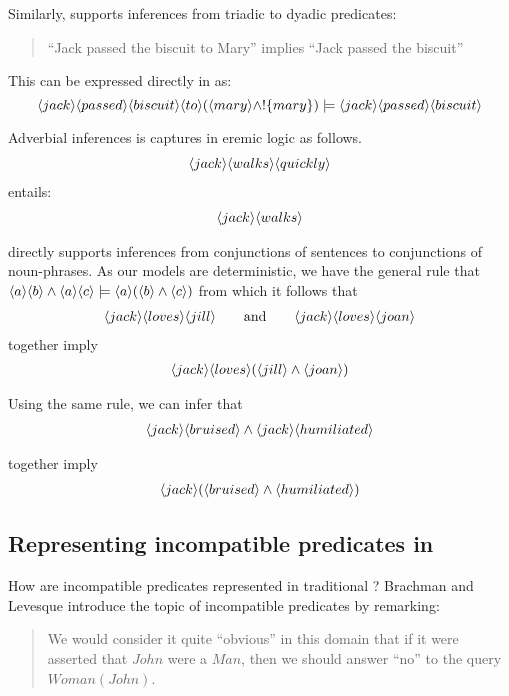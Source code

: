 \NI Similarly, \ELABR{} supports inferences from triadic to dyadic
predicates:
\begin{quote}
  ``Jack passed the biscuit to Mary'' implies ``Jack passed the biscuit''
\end{quote}

\NI This can be expressed directly in \ELABR{} as:
\[
   \langle jack \rangle \langle passed \rangle \langle biscuit \rangle \langle to \rangle (\langle mary \rangle \land !\{mary\}) \models \langle jack \rangle \langle passed \rangle \langle biscuit \rangle \]

\NI Adverbial inferences is captures in eremic logic as follows.
\begin{eqnarray*}
\langle jack \rangle \langle walks \rangle \langle quickly \rangle \end{eqnarray*}
entails:
\begin{eqnarray*}
\langle jack \rangle \langle walks \rangle \end{eqnarray*}

\NI \ELABR{} directly supports inferences from conjunctions of
sentences to conjunctions of noun-phrases.  As our models are
deterministic, we have the general rule that $ \langle a \rangle \langle b \rangle \land
\langle a \rangle \langle c \rangle \models \langle a \rangle (\langle b \rangle \land \langle c \rangle )$ from which
it follows that
\begin{eqnarray*}
   \langle jack \rangle \langle loves \rangle \langle jill \rangle \qquad\text{and}\qquad
   \langle jack \rangle \langle loves \rangle \langle joan \rangle \end{eqnarray*}
together imply
\begin{eqnarray*}
\langle jack \rangle \langle loves \rangle (\langle jill \rangle \land \langle joan \rangle )
\end{eqnarray*}

\NI Using the same rule, we can infer that
\begin{eqnarray*}
   \langle jack \rangle \langle bruised \rangle \land \langle jack \rangle \langle humiliated \rangle \end{eqnarray*}

\NI together imply
\begin{eqnarray*}
\langle jack \rangle (\langle bruised \rangle \land \langle humiliated \rangle )
\end{eqnarray*}
 
\subsection{Representing incompatible predicates in \FOL}\label{incompatiblepredicatesinfol}

\NI How are incompatible predicates represented in traditional
\fol?  Brachman and Levesque\cite{brachman} introduce the
topic of incompatible predicates by remarking:
\begin{quote}
   We would consider it quite ``obvious'' in this domain that if it
   were asserted that $John$ were a $Man$, then we should answer
   ``no'' to the query $Woman(John)$.
\end{quote}

